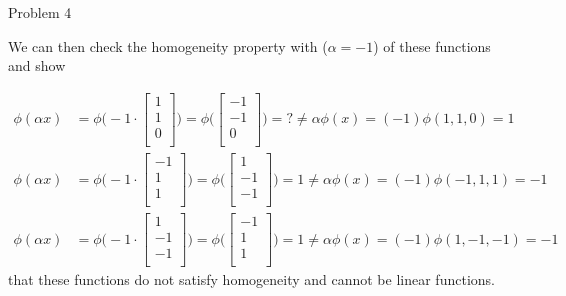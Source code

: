 \begin{problem}{Problem 4}
\begin{Highlight}[Solution]
        We can then check the homogeneity property with ($\alpha = -1$) of these functions and show

        \begin{align}
            \phi(\alpha x) & = \phi \Bigg(
                -1 \cdot 
                \begin{bmatrix}
                    1 \\
                    1 \\
                    0 \\
                \end{bmatrix}
                \Bigg) = \phi \Bigg(
                \begin{bmatrix}
                    -1 \\
                    -1 \\
                    0 \\
                \end{bmatrix}
                \Bigg) = ? \neq \alpha \phi(x) = (-1) \phi(1,1,0) = 1 \\
            \phi(\alpha x) & = \phi \Bigg(
                -1 \cdot 
                \begin{bmatrix}
                    -1 \\
                    1 \\
                    1 \\
                \end{bmatrix}
                \Bigg) = \phi \Bigg(
                \begin{bmatrix}
                    1 \\
                    -1 \\
                    -1 \\
                \end{bmatrix}
                \Bigg) = 1 \neq \alpha \phi(x) = (-1) \phi(-1,1,1) = -1  \\
            \phi(\alpha x) & = \phi \Bigg(
                -1 \cdot 
                \begin{bmatrix}
                    1 \\
                    -1 \\
                    -1 \\
                \end{bmatrix}
                \Bigg) = \phi \Bigg(
                \begin{bmatrix}
                    -1 \\
                    1 \\
                    1 \\
                \end{bmatrix}
                \Bigg) = 1 \neq \alpha \phi(x) = (-1)\phi(1,-1,-1) = -1
        \end{align}
        that these functions do not satisfy homogeneity and cannot be linear functions.
    \end{Highlight}
\end{problem}

